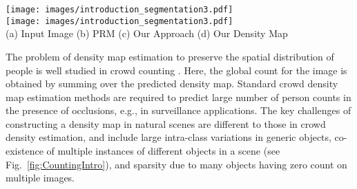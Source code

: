 \documentclass[10pt,twocolumn,letterpaper]{article}
\begin{document}
 \begin{figure*}[t]
		\centering
			\texttt{[image: images/introduction\_segmentation3.pdf]}\\
				\centering
				\texttt{[image: images/introduction\_segmentation3.pdf]}\\
				\vspace{-0.5cm}
\hspace*{0.01\linewidth} (a) Input Image \hspace*{0.1\linewidth} (b) PRM \cite{PRM}\hspace*{0.1\linewidth}(c) Our Approach  \hspace*{0.07\linewidth} (d) Our Density Map \\  


			\caption{Instance segmentation examples using the PRM method \cite{PRM} (b) and our approach (c), on the PASCAL VOC 2012. Top row: The PRM approach \cite{PRM} fails to delineate spatially adjacent two sheep category instances. Bottom row: single person parts predicted as multiple persons along with inaccurate mask separation results in over-prediction (7 instead of 5). Our approach produces accurate masks by exploiting the spatial distribution of object count in per-category density maps (d). Density map accumulation for each predicted mask is shown inside the contour drawn for clarity. In the top row, density maps for sheep and dog categories are overlaid. 
			}
			\label{fig:SegmentIntro}
			\vspace*{-0.3cm}
\end{figure*}





 The problem of density map estimation to preserve the spatial distribution of people is well studied in crowd counting \cite{Cao_2018_ECCV,FullyConvDensityICCV17, Zhang_2016_CVPR, CSRnetDialatedConv_2018_CVPR,rankingUnlabelleddata_CVPR2018}. Here, the global count for the image is obtained
by summing over the predicted density map. Standard crowd density map estimation methods are required to predict large number of person counts in the presence of occlusions, e.g., in surveillance applications. The key challenges of constructing a density map in natural scenes are different to those in crowd density estimation, and include large intra-class variations in generic objects, co-existence of multiple instances of different objects in a scene (see Fig.~\ref{fig:CountingIntro}), and sparsity due to many objects having zero count on multiple images. 
\end{document}
